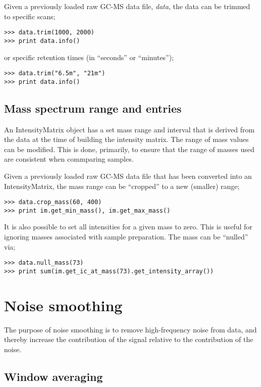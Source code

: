 Given a previously loaded raw GC-MS data file, {\em data}, the data can be
trimmed to specific scans;

\begin{verbatim}
>>> data.trim(1000, 2000)
>>> print data.info()
\end{verbatim}

\noindent
or specific retention times (in ``seconds'' or ``minutes'');
\begin{verbatim}
>>> data.trim("6.5m", "21m")
>>> print data.info()
\end{verbatim}

\subsection{Mass spectrum range and entries}



An IntensityMatrix object has a set mass range and interval that is derived
from the data at the time of building the intensity matrix. The range of mass
values can be modified. This is done, primarily, to ensure that the range of
masses used are consistent when commparing samples.

Given a previously loaded raw GC-MS data file that has been converted into an
IntensityMatrix, the mass range can be ``cropped'' to a new (smaller) range;

\begin{verbatim}
>>> data.crop_mass(60, 400)
>>> print im.get_min_mass(), im.get_max_mass()
\end{verbatim}

It is also possible to set all intensities for a given mass to zero. This is
useful for ignoring masses associated with sample preparation. The mass can be
``nulled'' via;

\begin{verbatim}
>>> data.null_mass(73)
>>> print sum(im.get_ic_at_mass(73).get_intensity_array())
\end{verbatim}

\section{Noise smoothing}

The purpose of noise smoothing is to remove high-frequency noise from
data, and thereby increase the contribution of the signal relative to
the contribution of the noise.

\subsection{Window averaging}

